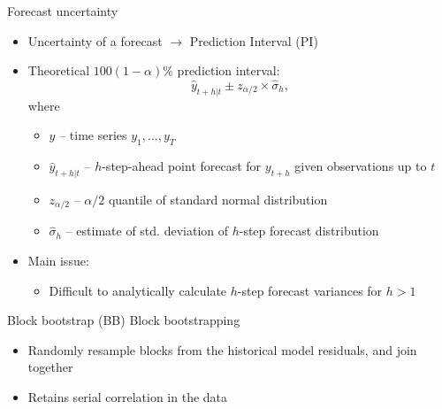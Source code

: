 \documentclass[
  12pt,
  ignorenonframetext,
  aspectratio=169,
]{beamer}
\begin{document}
\begin{frame}{Forecast uncertainty}
\label{forecast-uncertainty}
\begin{itemize}
  \item Uncertainty of a forecast \alert{${\rightarrow}$ Prediction Interval (PI)}
  \pause
  \item Theoretical $100(1 - \alpha)\%$ prediction interval:
$$
  \hat{y}_{t+h|t} \pm z_{\alpha/2} \times \hat{\sigma}_{h},
$$
where
  \begin{itemize}
    \item \small \color{black} $y$ -- \color{violet} time series $y_{1}, \dots, y_{T}$
    \item \small \color{black} $\hat{y}_{t+h|t}$ -- \color{violet} $h$-step-ahead point forecast for $y_{t+h}$ given observations up to $t$
    \item \small \color{black} $z_{\alpha/2}$ -- \color{violet} $\alpha/2$ quantile of standard normal distribution
    \item \small \color{black} $\hat{\sigma}_{h}$ -- \color{violet} estimate of std. deviation of $h$-step forecast distribution
  \end{itemize}
  \pause
  \item Main issue:
  \begin{itemize}
    \item \small \color{blue} Difficult to analytically calculate $h$-step forecast variances for $h > 1$
  \end{itemize}
\end{itemize}
\end{frame}

\begin{frame}{Block bootstrap (BB)}
\label{block-bootstrap-bb}
\alert{Block bootstrapping} \newline

\begin{itemize}
   \item Randomly resample blocks from the historical model residuals, and join together \newline
  \item Retains serial correlation in the data
\end{itemize}
\end{frame}
\end{document}
